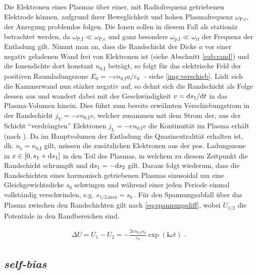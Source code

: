 \documentclass[numbers=noenddot,a4paper,notitlepage,twoside,BCOR15mm]{scrbook}
\newcommand{\diff}{\textnormal{d}}
\newcommand{\ix}[1]{_\text{#1}}
\newcommand{\imag}{\mathbf{i}}
\newcommand{\tilt}[1]{\textit{#1}}
\begin{document}
				Die Elektronen eines Plasmas über einer, mit Radiofrequenz getriebenen Elektrode können, aufgrund ihrer Beweglichkeit und hohen Plasmafrequenz $\omega\ix{P,e}$, der Anregung problemlos folgen. Die Ionen sollen in diesem Fall als stationär betrachtet werden, da $\omega\ix{P,I}\ll\omega\ix{P,e}$ und ganz besonders $\omega\ix{p,I}\ll\omega\ix{rf}$ der Frequenz der Entladung gilt. Nimmt man an, dass die Randschicht der Dicke $a$ vor einer negativ geladenen Wand frei von Elektronen ist (siehe Abschnitt \ref{sub:rand}) und die Ionendichte dort konstant $n\ix{0,I}$ beträgt, so folgt für das elektrische Feld der positiven Raumladungszone $E\ix{0}=-en\ix{0,I}a/\varepsilon\ix{0}\,\,$ - siehe \autoref{img:verschieb}. Lädt sich die Kammerwand nun stärker negativ auf, so dehnt sich die Randschicht als Folge dessen aus und wandert dabei mit der Geschwindigkeit $v=\diff s\ix{1}/\diff t$ in das Plasma-Volumen hinein. Dies führt zum bereits erwähnten Verschiebungstrom in der Randschicht $j\ix{V}=-en\ix{0,I}v$, welcher zusammen mit dem Strom der, aus der Schicht "`verdrängten"' Elektronen $j\ix{L}=-en\ix{0,I}v$ die Kontinuität im Plasma erhält (nach \cite{Godyak90d}). Da im Hauptvolumen der Entladung die Quasineutralität erhalten ist, dh. $n\ix{e}=n\ix{0,I}$ gilt, müssen die zusätzlichen Elektronen aus der pos. Ladungszone in $x\in\left[0,s\ix{1}+\diff s\ix{1}\right]$ in den Teil des Plasmas, in welchem zu diesem Zeitpunkt die Randschicht schrumpft und $\diff s\ix{1}=-\diff s\ix{2}$ gilt. Daraus folgt wiederum, dass die Randschichten eines harmonisch getriebenen Plasmas sinusoidal um eine Gleichgewichtsdicke $s\ix{0}$ schwingen und während einer jeden Periode einmal vollständig verschwinden, e.g. $s\ix{1/2,max}=s\ix{0}\,$.  Für den Spannungsabfall über das Plasma zwischen den Randschichten gilt nach \cite{Piel10} \autoref{eq:spannungsdiff}, wobei $U\ix{1/2}$ die Potentiale in den Randbereichen sind. 

					\begin{align}
						\Delta U=U\ix{1}-U\ix{2}=-\frac{2en\ix{0,I}s\ix{0}}{\varepsilon\ix{0}}\exp\left(\imag\omega t\right)\,\,. \label{eq:spannungsdiff}
					\end{align}

				\subsection{\tilt{self-bias}}  \label{subsub:self-bias}
\end{document}
